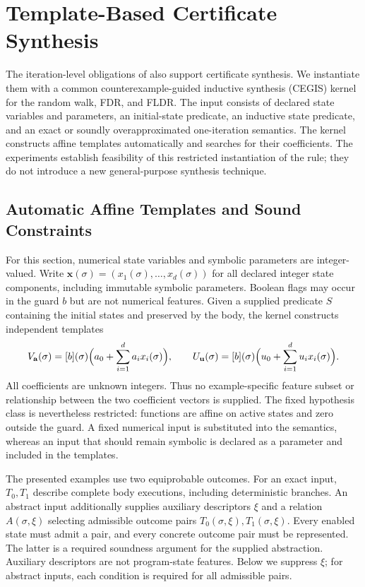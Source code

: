 \section{Template-Based Certificate Synthesis}
\label{sec:certificate-synthesis}

The iteration-level obligations of  also support
certificate synthesis. We instantiate them with a common
counterexample-guided inductive synthesis (CEGIS) kernel for the random
walk, FDR, and FLDR. The input consists of declared state variables and
parameters, an initial-state predicate, an inductive state predicate, and
an exact or soundly overapproximated one-iteration semantics. The kernel
constructs affine templates automatically and searches for their
coefficients. The experiments establish feasibility of this restricted
instantiation of the rule; they do not introduce a new general-purpose
synthesis technique.

\subsection{Automatic Affine Templates and Sound Constraints}
\label{sec:synthesis-constraints}

For this section, numerical state variables and symbolic parameters are
integer-valued. Write $\mathbf{x}(\sigma)=(x_1(\sigma),\ldots,x_d(\sigma))$
for all declared integer state components, including immutable symbolic
parameters. Boolean flags may occur in the guard $b$ but are not numerical
features. Given a supplied predicate $S$ containing the initial states and
preserved by the body, the kernel constructs independent templates
\[
 V_{\mathbf a}(\sigma)=[b](\sigma)
   \Bigl(a_0+\sum_{i=1}^{d}a_i x_i(\sigma)\Bigr),\qquad
 U_{\mathbf u}(\sigma)=[b](\sigma)
   \Bigl(u_0+\sum_{i=1}^{d}u_i x_i(\sigma)\Bigr).
\]
All coefficients are unknown integers. Thus no example-specific feature
subset or relationship between the two coefficient vectors is supplied.
The fixed hypothesis class is nevertheless restricted: functions are
affine on active states and zero outside the guard. A fixed numerical
input is substituted into the semantics, whereas an input that should
remain symbolic is declared as a parameter and included in the templates.

The presented examples use two equiprobable outcomes. For an exact input,
$T_0,T_1$ describe complete body executions, including deterministic
branches. An abstract input additionally supplies auxiliary descriptors
$\xi$ and a relation $A(\sigma,\xi)$ selecting admissible outcome pairs
$T_0(\sigma,\xi),T_1(\sigma,\xi)$. Every enabled state must admit a
pair, and every concrete outcome pair must be represented. The latter is
a required soundness argument for the supplied abstraction. Auxiliary
descriptors are not program-state features. Below we suppress $\xi$;
for abstract inputs, each condition is required for all admissible pairs.

